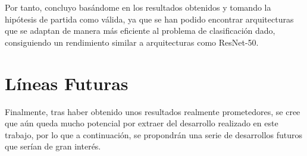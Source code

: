 Por tanto, concluyo basándome en los resultados obtenidos y tomando la hipótesis de partida como válida, ya que se han podido encontrar arquitecturas que se adaptan de manera más eficiente al problema de clasificación dado, consiguiendo un rendimiento similar a arquitecturas como ResNet-50.


\section{Líneas Futuras}

Finalmente, tras haber obtenido unos resultados realmente prometedores, se cree que aún queda mucho potencial por extraer del desarrollo realizado en este trabajo, por lo que a continuación, se propondrán una serie de desarrollos futuros que serían de gran interés.

